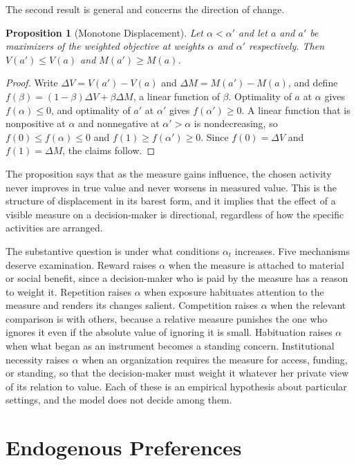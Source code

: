 \documentclass[11pt]{report}
\newtheorem{proposition}[theorem]{Proposition}
\theoremstyle{definition}
\theoremstyle{remark}
\begin{document}
The second result is general and concerns the direction of change.

\begin{proposition}[Monotone Displacement]\label{prop:monotone}
Let $\alpha<\alpha'$ and let $a$ and $a'$ be maximizers of the weighted objective at weights $\alpha$ and $\alpha'$ respectively. Then $V(a')\le V(a)$ and $M(a')\ge M(a)$.
\end{proposition}

\begin{proof}
Write $\Delta V=V(a')-V(a)$ and $\Delta M=M(a')-M(a)$, and define $f(\beta)=(1-\beta)\Delta V+\beta\Delta M$, a linear function of $\beta$. Optimality of $a$ at $\alpha$ gives $f(\alpha)\le0$, and optimality of $a'$ at $\alpha'$ gives $f(\alpha')\ge0$. A linear function that is nonpositive at $\alpha$ and nonnegative at $\alpha'>\alpha$ is nondecreasing, so $f(0)\le f(\alpha)\le0$ and $f(1)\ge f(\alpha')\ge0$. Since $f(0)=\Delta V$ and $f(1)=\Delta M$, the claims follow.
\end{proof}

The proposition says that as the measure gains influence, the chosen activity never improves in true value and never worsens in measured value. This is the structure of displacement in its barest form, and it implies that the effect of a visible measure on a decision-maker is directional, regardless of how the specific activities are arranged.

The substantive question is under what conditions $\alpha_t$ increases. Five mechanisms deserve examination. Reward raises $\alpha$ when the measure is attached to material or social benefit, since a decision-maker who is paid by the measure has a reason to weight it. Repetition raises $\alpha$ when exposure habituates attention to the measure and renders its changes salient. Competition raises $\alpha$ when the relevant comparison is with others, because a relative measure punishes the one who ignores it even if the absolute value of ignoring it is small. Habituation raises $\alpha$ when what began as an instrument becomes a standing concern. Institutional necessity raises $\alpha$ when an organization requires the measure for access, funding, or standing, so that the decision-maker must weight it whatever her private view of its relation to value. Each of these is an empirical hypothesis about particular settings, and the model does not decide among them.

\section{Endogenous Preferences}
\end{document}
